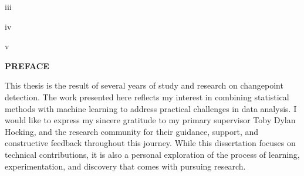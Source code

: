 \documentclass[12pt]{article}
\begin{document}
{}

\thispagestyle{empty}
\setcounter{tocdepth}{2}

\begingroup
\footnotesize
\singlespacing
\tableofcontents
\endgroup

\vfill
\begin{center}
iii
\end{center}


\clearpage
\setcounter{page}{4}
\renewcommand{\thepage}{\roman{page}}

\listoftables
{}

\thispagestyle{empty}

\vfill
\begin{center}
iv
\end{center}

\clearpage
\renewcommand{\thepage}{\arabic{page}}


\clearpage
\setcounter{page}{5}
\renewcommand{\thepage}{\roman{page}}


\begingroup
\footnotesize
\listoffigures
\endgroup


\thispagestyle{empty}

\vfill
\begin{center}
v
\end{center}

\clearpage
\renewcommand{\thepage}{\arabic{page}}

\clearpage
\setcounter{page}{6}
\renewcommand{\thepage}{\roman{page}}

{}

\thispagestyle{empty}

\begin{center}
    \textbf{PREFACE}\\
\end{center}

\vspace{\baselineskip}
This thesis is the result of several years of study and research on changepoint detection. The work presented here reflects my interest in combining statistical methods with machine learning to address practical challenges in data analysis. I would like to express my sincere gratitude to my primary supervisor Toby Dylan Hocking, and the research community for their guidance, support, and constructive feedback throughout this journey. While this dissertation focuses on technical contributions, it is also a personal exploration of the process of learning, experimentation, and discovery that comes with pursuing research.
\end{document}
